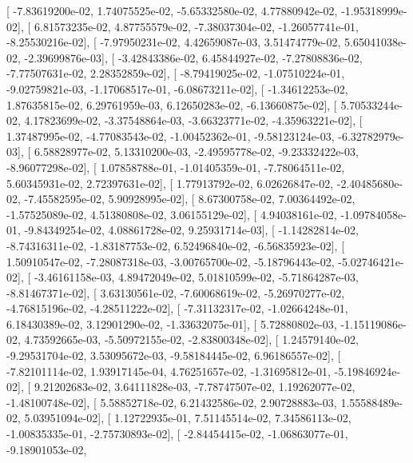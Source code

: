 \documentclass{article}
\begin{document}
       [ -7.83619200e-02,   1.74075525e-02,  -5.65332580e-02,
          4.77880942e-02,  -1.95318999e-02],
       [  6.81573235e-02,   4.87755579e-02,  -7.38037304e-02,
         -1.26057741e-01,  -8.25530216e-02],
       [ -7.97950231e-02,   4.42659087e-03,   3.51474779e-02,
          5.65041038e-02,  -2.39699876e-03],
       [ -3.42843386e-02,   6.45844927e-02,  -7.27808836e-02,
         -7.77507631e-02,   2.28352859e-02],
       [ -8.79419025e-02,  -1.07510224e-01,  -9.02759821e-03,
         -1.17068517e-01,  -6.08673211e-02],
       [ -1.34612253e-02,   1.87635815e-02,   6.29761959e-03,
          6.12650283e-02,  -6.13660875e-02],
       [  5.70533244e-02,   4.17823699e-02,  -3.37548864e-03,
         -3.66323771e-02,  -4.35963221e-02],
       [  1.37487995e-02,  -4.77083543e-02,  -1.00452362e-01,
         -9.58123124e-03,  -6.32782979e-03],
       [  6.58828977e-02,   5.13310200e-03,  -2.49595778e-02,
         -9.23332422e-03,  -8.96077298e-02],
       [  1.07858788e-01,  -1.01405359e-01,  -7.78064511e-02,
          5.60345931e-02,   2.72397631e-02],
       [  1.77913792e-02,   6.02626847e-02,  -2.40485680e-02,
         -7.45582595e-02,   5.90928995e-02],
       [  8.67300758e-02,   7.00364492e-02,  -1.57525089e-02,
          4.51380808e-02,   3.06155129e-02],
       [  4.94038161e-02,  -1.09784058e-01,  -9.84349254e-02,
          4.08861728e-02,   9.25931714e-03],
       [ -1.14282814e-02,  -8.74316311e-02,  -1.83187753e-02,
          6.52496840e-02,  -6.56835923e-02],
       [  1.50910547e-02,  -7.28087318e-03,  -3.00765700e-02,
         -5.18796443e-02,  -5.02746421e-02],
       [ -3.46161158e-03,   4.89472049e-02,   5.01810599e-02,
         -5.71864287e-03,  -8.81467371e-02],
       [  3.63130561e-02,  -7.60068619e-02,  -5.26970277e-02,
         -4.76815196e-02,  -4.28511222e-02],
       [ -7.31132317e-02,  -1.02664248e-01,   6.18430389e-02,
          3.12901290e-02,  -1.33632075e-01],
       [  5.72880802e-03,  -1.15119086e-02,   4.73592665e-03,
         -5.50972155e-02,  -2.83800348e-02],
       [  1.24579140e-02,  -9.29531704e-02,   3.53095672e-03,
         -9.58184445e-02,   6.96186557e-02],
       [ -7.82101114e-02,   1.93917145e-04,   4.76251657e-02,
         -1.31695812e-01,  -5.19846924e-02],
       [  9.21202683e-02,   3.64111828e-03,  -7.78747507e-02,
          1.19262077e-02,  -1.48100748e-02],
       [  5.58852718e-02,   6.21432586e-02,   2.90728883e-03,
          1.55588489e-02,   5.03951094e-02],
       [  1.12722935e-01,   7.51145514e-02,   7.34586113e-02,
         -1.00835335e-01,  -2.75730893e-02],
       [ -2.84454415e-02,  -1.06863077e-01,  -9.18901053e-02,
\end{document}
